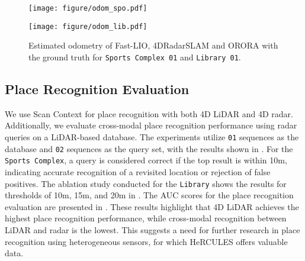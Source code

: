 

\begin{figure}[!t]
    \centering
    \texttt{[image: figure/odom\_spo.pdf]}
    \vspace{-8.5mm}
\end{figure}

\begin{figure}[!t]
    \centering
    \texttt{[image: figure/odom\_lib.pdf]}
    \caption{Estimated odometry of Fast-LIO, 4DRadarSLAM and ORORA with the ground truth for \texttt{Sports Complex 01} and \texttt{Library 01}.}
    \label{fig:slam}
    \vspace{-7.8mm}
\end{figure}


\subsection{Place Recognition Evaluation}
We use Scan Context \cite{kim2018scan} for place recognition with both 4D \ac{LiDAR} and 4D radar. Additionally, we evaluate cross-modal place recognition performance using radar queries on a \ac{LiDAR}-based database. The experiments utilize \texttt{01} sequences as the database and \texttt{02} sequences as the query set, with the results shown in . For the \texttt{Sports Complex}, a query is considered correct if the top result is within \unit{10}{m}, indicating accurate recognition of a revisited location or rejection of false positives. The ablation study conducted for the \texttt{Library} shows the results for thresholds of \unit{10}{m}, \unit{15}{m}, and \unit{20}{m} in . The AUC scores for the place recognition evaluation are presented in .
These results highlight that 4D \ac{LiDAR} achieves the highest place recognition performance, while cross-modal recognition between \ac{LiDAR} and radar is the lowest. This suggests a need for further research in place recognition using heterogeneous sensors, for which HeRCULES offers valuable data.

